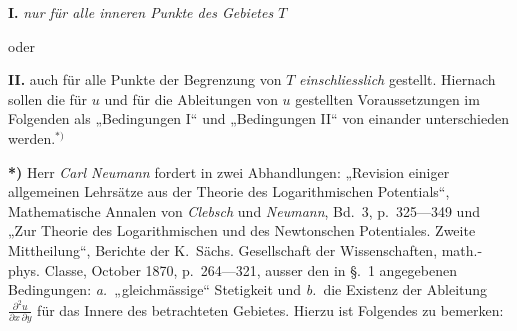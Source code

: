 \documentclass{article}
\begin{document}
\textbf{I.} \emph{nur für alle inneren Punkte des Gebietes $T$}

oder

\textbf{II.} auch für alle Punkte der Begrenzung von $T$ \emph{einschliesslich} gestellt.
Hiernach sollen die für $u$ und für die Ableitungen von $u$ gestellten Voraussetzungen im Folgenden als „Bedingungen I“ und „Bedingungen II“ von einander unterschieden werden.${}^{*)}$

\textbf{*)} Herr \emph{Carl Neumann} fordert in zwei Abhandlungen: „Revision einiger allgemeinen Lehrsätze aus der Theorie des Logarithmischen Potentials“, Mathematische Annalen von \emph{Clebsch} und \emph{Neumann}, Bd.~3, p.~325---349 und „Zur Theorie des Logarithmischen und des Newtonschen Potentiales. Zweite Mittheilung“, Berichte der K.~Sächs. Gesellschaft der Wissenschaften, math.-phys. Classe, October 1870, p.~264---321, ausser den in §.~1 angegebenen Bedingungen: \emph{a.}~„gleichmässige“ Stetigkeit und \emph{b.}~die Existenz der Ableitung $\frac{\partial^2 u}{\partial x\,\partial y}$ für das Innere des betrachteten Gebietes. Hierzu ist Folgendes zu bemerken:
\end{document}
